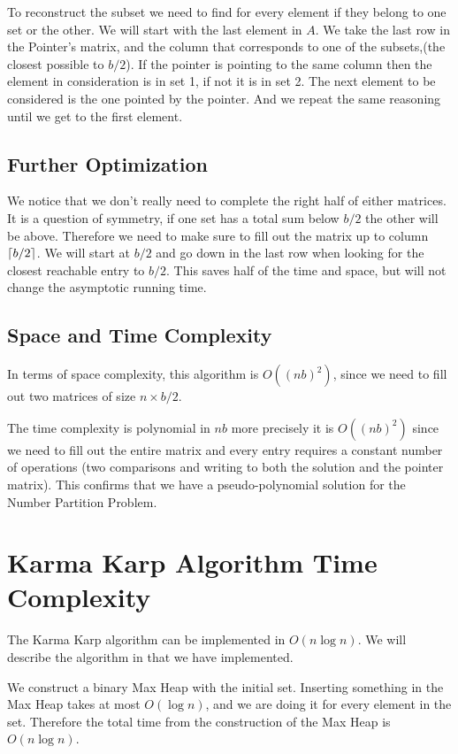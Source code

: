 \documentclass[11pt]{article}
\DeclarePairedDelimiter\ceil{\lceil}{\rceil}
\begin{document}
To reconstruct the subset we need to find for every element if they belong to one set or the other. We will start with the last element in $A$. We take the last row in the Pointer's matrix, and the column that corresponds to one of the subsets,(the closest possible to $b/2$). If the pointer is pointing to the same column then the element in consideration is in set 1, if not it is in set 2. The next element to be considered is the one pointed by the pointer. And we repeat the same reasoning until we get to the first element.

\subsection{Further Optimization}
We notice that we don't really need to complete the right half of either matrices. It is a question of symmetry, if one set has a total sum below $b/2$ the other will be above. Therefore we need to make sure to fill out the matrix up to column $\ceil*{b/2}$. We will start at $b/2$ and go down in the last row when looking for the closest reachable entry to $b/2$.
This saves half of the time and space, but will not change the asymptotic running time. 

\subsection{Space and Time Complexity}

In terms of space complexity, this algorithm is $O((nb)^2)$, since we need to fill out two matrices of size $n\times b/2$.

The time complexity is polynomial in $nb$ more precisely it is $O((nb)^2)$ since we need to fill out the entire matrix and every entry requires a constant number of operations (two comparisons and writing to both the solution and the pointer matrix). This confirms that we have a pseudo-polynomial solution for the Number Partition Problem. 




\section{Karma Karp Algorithm Time Complexity}
The Karma Karp algorithm can be implemented in $O(n\log n)$. 
We will describe the algorithm in that we have implemented.

We construct a binary Max Heap with the initial set. Inserting something in the Max Heap takes at most $O(\log n)$, and we are doing it for every element in the set. Therefore the total time from the construction of the Max Heap is $O(n \log n)$.
\end{document}
